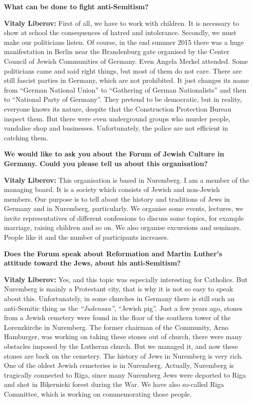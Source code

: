 \textbf{What can be done to fight anti-Semitism?} 

\textbf{Vitaly Liberov:} First of all, we have to work with children. It is necessary to show at school the consequences of hatred and intolerance. Secondly, we must make our politicians listen. Of course, in the end summer 2015 there was a huge manifestation in Berlin near the Brandenburg gate organised by the Center Council of Jewish Communities of Germany. Even Angela Merkel attended. Some politicians came and said right things, but most of them do not care. There are still fascist parties in Germany, which are not prohibited. It just changes its name from ``German National Union'' to ``Gathering of German Nationalists'' and then to ``National Party of Germany''. They pretend to be democratic, but in reality, everyone knows its nature, despite that the Construction Protection Bureau inspect them. But there were even underground groups who murder people, vandalise shop and businesses. Unfortunately, the police are not efficient in catching them. 

\textbf{We would like to ask you about the Forum of Jewish Culture in Germany. Could you please tell us about this organisation?}  

\textbf{Vitaly Liberov:} This organisation is based in Nuremberg. I am a member of the managing board. It is a society which consists of Jewish and non-Jewish members. Our purpose is to tell about the history and traditions of Jews in Germany and in Nuremberg, particularly. We organise some events, lectures, we invite representatives of different confessions to discuss some topics, for example marriage, raising children and so on. We also organise excursions and seminars. People like it and the number of participants increases.  

\textbf{Does the Forum speak about Reformation and Martin Luther’s attitude toward the Jews, about his anti-Semitism?} 

\textbf{Vitaly Liberov:} Yes, and this topic was especially interesting for Catholics. But Nuremberg is mainly a Protestant city, that is why it is not so easy to speak about this. Unfortunately, in some churches in Germany there is still such an anti-Semitic thing as the \textit{``Judensau''}, ``Jewish pig''. Just a few years ago, stones from a Jewish cemetery were found in the floor of the southern tower of the Lorenzkirche in Nuremberg. The former chairman of the Community, Arno Hamburger, was working on taking these stones out of church, there were many obstacles imposed by the Lutheran church. But we managed it, and now these stones are back on the cemetery. The history of Jews in Nuremberg is very rich. One of the oldest Jewish cemeteries is in Nuremberg. Actually, Nuremberg is tragically connected to Riga, since many Nuremberg Jews were deported to Riga and shot in Biķernieki forest during the War. We have also so-called Riga Committee, which is working on commemorating those people.  